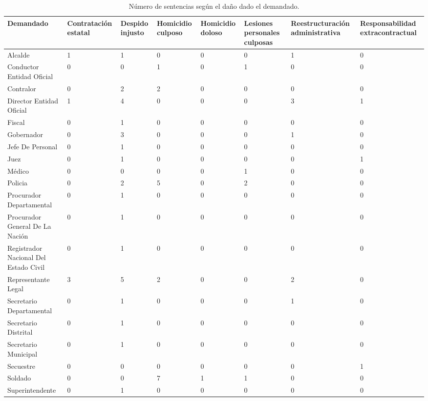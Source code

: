 \begin{table}[!htbp]
\centering
\caption{Número de sentencias según el daño dado el demandado.} 
\label{tab:danodemandado}
\begin{tabular}{p{4cm}R{2.6cm}R{2.6cm}R{2.6cm}R{2.6cm}R{2.6cm}R{2.6cm}R{2.6cm}}
  \hline
Demandado & Contratación estatal & Despido injusto & Homicidio culposo & Homicidio doloso & Lesiones personales culposas & Reestructuración administrativa & Responsabilidad extracontractual \\ 
  \hline
Alcalde &  1 &  1 &  0 &  0 &  0 &  1 &  0 \\ 
  Conductor Entidad Oficial &  0 &  0 &  1 &  0 &  1 &  0 &  0 \\ 
  Contralor &  0 &  2 &  2 &  0 &  0 &  0 &  0 \\ 
  Director Entidad Oficial &  1 &  4 &  0 &  0 &  0 &  3 &  1 \\ 
  Fiscal &  0 &  1 &  0 &  0 &  0 &  0 &  0 \\ 
  Gobernador &  0 &  3 &  0 &  0 &  0 &  1 &  0 \\ 
  Jefe De Personal &  0 &  1 &  0 &  0 &  0 &  0 &  0 \\ 
  Juez &  0 &  1 &  0 &  0 &  0 &  0 &  1 \\ 
  Médico &  0 &  0 &  0 &  0 &  1 &  0 &  0 \\ 
  Policia &  0 &  2 &  5 &  0 &  2 &  0 &  0 \\ 
  Procurador Departamental &  0 &  1 &  0 &  0 &  0 &  0 &  0 \\ 
  Procurador General De La Nación &  0 &  1 &  0 &  0 &  0 &  0 &  0 \\ 
  Registrador Nacional Del Estado Civil &  0 &  1 &  0 &  0 &  0 &  0 &  0 \\ 
  Representante Legal &  3 &  5 &  2 &  0 &  0 &  2 &  0 \\ 
  Secretario Departamental &  0 &  1 &  0 &  0 &  0 &  1 &  0 \\ 
  Secretario Distrital &  0 &  1 &  0 &  0 &  0 &  0 &  0 \\ 
  Secretario Municipal &  0 &  1 &  0 &  0 &  0 &  0 &  0 \\ 
  Secuestre &  0 &  0 &  0 &  0 &  0 &  0 &  1 \\ 
  Soldado &  0 &  0 &  7 &  1 &  1 &  0 &  0 \\ 
  Superintendente &  0 &  1 &  0 &  0 &  0 &  0 &  0 \\ 
   \hline
\end{tabular}
\end{table}
